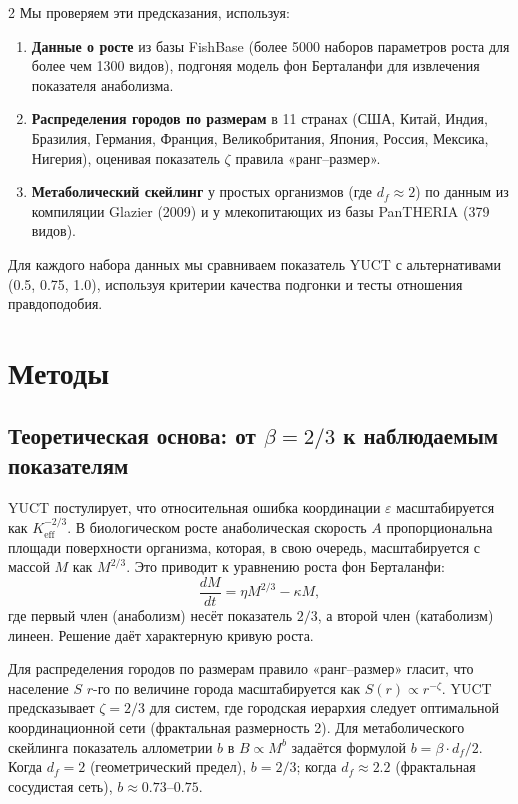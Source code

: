 \documentclass[11pt,a4paper]{article}
\newcommand{\eps}{\varepsilon}
\newcommand{\Keff}{K_{\mathrm{eff}}}
\newcommand{\betaf}{\beta}
\newcommand{\df}{d_f}
\begin{document}
\begin{multicols}{2}
		Мы проверяем эти предсказания, используя:
		\begin{enumerate}
			\item \textbf{Данные о росте} из базы FishBase (более 5000 наборов параметров роста для более чем 1300 видов), подгоняя модель фон Берталанфи для извлечения показателя анаболизма.
			\item \textbf{Распределения городов по размерам} в 11 странах (США, Китай, Индия, Бразилия, Германия, Франция, Великобритания, Япония, Россия, Мексика, Нигерия), оценивая показатель \(\zeta\) правила «ранг–размер».
			\item \textbf{Метаболический скейлинг} у простых организмов (где \(\df \approx 2\)) по данным из компиляции Glazier (2009) и у млекопитающих из базы PanTHERIA (379 видов).
		\end{enumerate}
		Для каждого набора данных мы сравниваем показатель YUCT с альтернативами (0.5, 0.75, 1.0), используя критерии качества подгонки и тесты отношения правдоподобия.
		
		\section{Методы}
		
		\subsection{Теоретическая основа: от \(\beta = 2/3\) к наблюдаемым показателям}
		
		YUCT постулирует, что относительная ошибка координации \(\eps\) масштабируется как \(\Keff^{-2/3}\). В биологическом росте анаболическая скорость \(A\) пропорциональна площади поверхности организма, которая, в свою очередь, масштабируется с массой \(M\) как \(M^{2/3}\). Это приводит к уравнению роста фон Берталанфи:
		\[
		\frac{dM}{dt} = \eta M^{2/3} - \kappa M,
		\]
		где первый член (анаболизм) несёт показатель \(2/3\), а второй член (катаболизм) линеен. Решение даёт характерную кривую роста.
		
		Для распределения городов по размерам правило «ранг–размер» гласит, что население \(S\) \(r\)-го по величине города масштабируется как \(S(r) \propto r^{-\zeta}\). YUCT предсказывает \(\zeta = 2/3\) для систем, где городская иерархия следует оптимальной координационной сети (фрактальная размерность 2). Для метаболического скейлинга показатель аллометрии \(b\) в \(B \propto M^{b}\) задаётся формулой \(b = \betaf \cdot \df / 2\). Когда \(\df = 2\) (геометрический предел), \(b = 2/3\); когда \(\df \approx 2.2\) (фрактальная сосудистая сеть), \(b \approx 0.73\)–\(0.75\).
		

\end{multicols}
\end{document}
